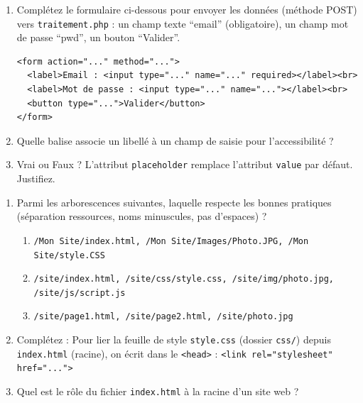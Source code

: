 \documentclass[11pt]{article}
\begin{document}
\begin{exercice}
\begin{enumerate}
    \item Complétez le formulaire ci-dessous pour envoyer les données (méthode POST) vers \texttt{traitement.php} : un champ texte ``email'' (obligatoire), un champ mot de passe ``pwd'', un bouton ``Valider''.
\begin{verbatim}
<form action="..." method="...">
  <label>Email : <input type="..." name="..." required></label><br>
  <label>Mot de passe : <input type="..." name="..."></label><br>
  <button type="...">Valider</button>
</form>
\end{verbatim}
    \item Quelle balise associe un libellé à un champ de saisie pour l'accessibilité ?
    \item Vrai ou Faux ? L'attribut \texttt{placeholder} remplace l'attribut \texttt{value} par défaut. Justifiez.
\end{enumerate}
\end{exercice}

\begin{exercice}
\begin{enumerate}
    \item Parmi les arborescences suivantes, laquelle respecte les bonnes pratiques (séparation ressources, noms minuscules, pas d'espaces) ?
    \begin{enumerate}
        \item \texttt{/Mon Site/index.html, /Mon Site/Images/Photo.JPG, /Mon Site/style.CSS}
        \item \texttt{/site/index.html, /site/css/style.css, /site/img/photo.jpg, /site/js/script.js}
        \item \texttt{/site/page1.html, /site/page2.html, /site/photo.jpg}
    \end{enumerate}
    \item Complétez : Pour lier la feuille de style \texttt{style.css} (dossier \texttt{css/}) depuis \texttt{index.html} (racine), on écrit dans le \texttt{<head>} : 
    \texttt{<link rel="stylesheet" href="...">}
    \item Quel est le rôle du fichier \texttt{index.html} à la racine d'un site web ?
\end{enumerate}
\end{exercice}
\end{document}
